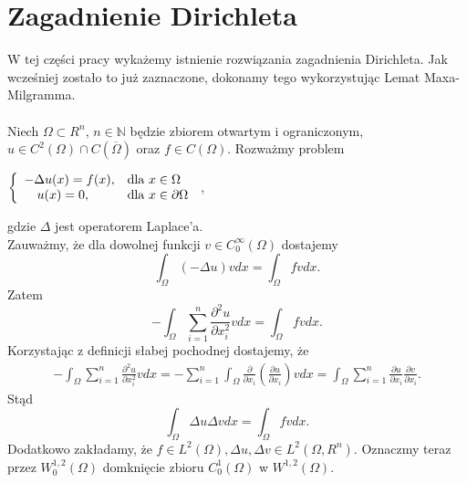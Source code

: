 \documentclass[12pt,a4paper,oneside,titlepage]{article}
\begin{document}
\section{Zagadnienie Dirichleta}
W tej części pracy wykażemy istnienie rozwiązania zagadnienia Dirichleta. Jak wcześniej zostało to już zaznaczone, dokonamy tego wykorzystując Lemat Maxa-Milgramma. \\ \\
\indent
Niech $\Omega \subset R^{n}$, $n \in \mathbb{N}$ będzie zbiorem otwartym i ograniczonym, $u \in C^{2}(\Omega) \cap C(\overline{\Omega})$ oraz $f \in C(\Omega)$. 
Rozważmy problem
\begin{center}
\label{ProblemP}
$
 \left\{ \begin{array}{ll}
- \Delta u(x) = f(x), & \textrm{dla $ x \in \Omega$}\\
~~~u(x)=0, & \textrm{dla $ x \in \partial \Omega $} \\
\end{array} \right.
$ ,
\end{center}
gdzie $\Delta$ jest operatorem Laplace'a. \\
Zauważmy, że dla dowolnej funkcji $v \in C^{\infty}_0 (\Omega)$ dostajemy
\begin{equation}
\nonumber
\int_{\Omega} (-\Delta u ) v dx = \int_{\Omega} f v dx .
\end{equation}
Zatem
\begin{equation}
\nonumber
- \int_{\Omega} \sum_{i=1}^n \frac{\partial^2 u}{\partial x_i^2} v dx = \int_{\Omega} f v dx .
\end{equation}
Korzystając z definicji słabej pochodnej dostajemy, że 
\begin{equation}
\nonumber
\begin{split}
- \int_{\Omega} \sum_{i=1}^n \frac{\partial^2 u}{\partial x_i^2} v dx = - \sum_{i=1}^n \int_{\Omega} \frac{\partial}{\partial x_i} \left( \frac{\partial u}{\partial x_i} \right) v dx = \int_{\Omega} \sum_{i=1}^n \frac{\partial u}{\partial x_i} \frac{\partial v}{\partial x _i}.
\end{split}
\end{equation}
Stąd
\begin{equation}
\nonumber
\int_{\Omega} \Delta u \Delta v dx = \int_{\Omega} f v dx.
\end{equation}
Dodatkowo zakładamy, że $f \in L^{2}(\Omega), \Delta u, \Delta v \in L^{2}(\Omega, R^n).$
Oznaczmy teraz przez $W^{1,2}_0(\Omega)$ domknięcie zbioru $C^1_0(\Omega) $ w $W^{1,2}(\Omega)$. \\
\end{document}
